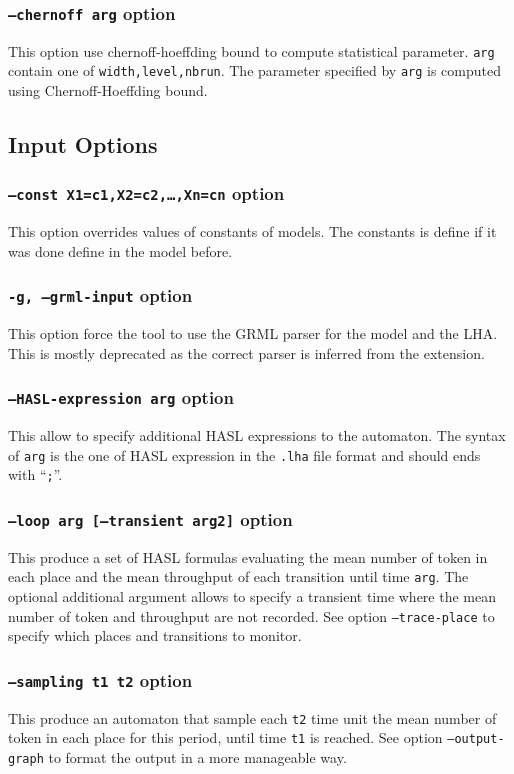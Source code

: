 \documentclass{article}
\begin{document}
\subsubsection{\texttt{--chernoff arg}  option}
This option use chernoff-hoeffding bound to compute statistical parameter.
\texttt{arg} contain one of \texttt{width,level,nbrun}. The parameter 
specified by \texttt{arg} is computed using Chernoff-Hoeffding bound.

\subsection{Input Options}

\subsubsection{\texttt{--const X1=c1,X2=c2,\dots,Xn=cn}  option}
This option overrides values of constants of models. The constants is
define if it was done define in the model before.

\subsubsection{\texttt{-g, --grml-input}  option}
This option force the tool to use the GRML parser for the model and
the LHA. This is mostly deprecated as the correct parser is inferred
from the extension.

\subsubsection{\texttt{--HASL-expression arg}  option}
This allow to specify additional HASL{} expressions to the automaton.
The syntax of \texttt{arg} is the one of HASL{} expression in the
\texttt{.lha} file format and should ends with ``\texttt{;}''.

\subsubsection{\texttt{--loop arg [--transient arg2]}  option}
This produce a set of HASL formulas evaluating the mean number of 
token in each place and the mean throughput of each transition until time
\texttt{arg}. The optional additional argument allows to specify a transient
time where the mean number of token and throughput are not recorded.
See option \texttt{--trace-place} to specify which places and transitions 
to monitor.

\subsubsection{\texttt{--sampling t1 t2} option}
This produce an automaton that sample each \texttt{t2} time unit the
mean number of token in each place for this period, until time
\texttt{t1} is reached.  See option \texttt{--output-graph} to format
the output in a more manageable way.
\end{document}
